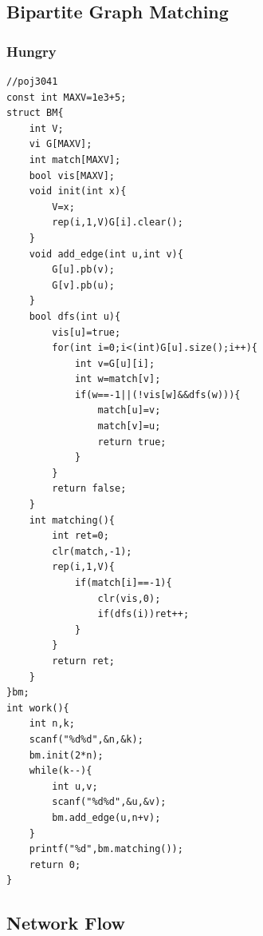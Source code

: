 \documentclass[twoside]{article}
\begin{document}
\subsection{Bipartite Graph Matching}
\subsubsection{Hungry}
\begin{lstlisting}
//poj3041
const int MAXV=1e3+5;
struct BM{
    int V;
    vi G[MAXV];
    int match[MAXV];
    bool vis[MAXV];
    void init(int x){
        V=x;
        rep(i,1,V)G[i].clear();
    }
    void add_edge(int u,int v){
        G[u].pb(v);
        G[v].pb(u);
    }
    bool dfs(int u){
        vis[u]=true;
        for(int i=0;i<(int)G[u].size();i++){
            int v=G[u][i];
            int w=match[v];
            if(w==-1||(!vis[w]&&dfs(w))){
                match[u]=v;
                match[v]=u;
                return true;
            }
        }
        return false;
    }
    int matching(){
        int ret=0;
        clr(match,-1);
        rep(i,1,V){
            if(match[i]==-1){
                clr(vis,0);
                if(dfs(i))ret++;
            }
        }
        return ret;
    }
}bm;
int work(){
    int n,k;
    scanf("%d%d",&n,&k);
    bm.init(2*n);
    while(k--){
        int u,v;
        scanf("%d%d",&u,&v);
        bm.add_edge(u,n+v);
    }
    printf("%d",bm.matching());
    return 0;
}

\end{lstlisting}
\subsection{Network Flow}
\end{document}
